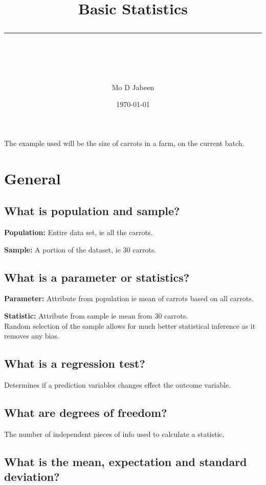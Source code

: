 \documentclass[11pt]{scrartcl} %
\title{	
	\normalfont\normalsize
	\vspace{20pt} %
	{\huge Basic Statistics}\\ %
	\vspace{12pt} %
	\rule{\linewidth}{2pt}\\ %
}
\author{\small Mo D Jabeen} %
\date{\normalsize\today} %
\begin{document}
\maketitle %

The example used will be the size of carrots in a farm, on the current batch.

\section{General}

\subsection{What is population and sample?}

\textbf{Population:} Entire data set, ie all the carrots.

\textbf{Sample:} A portion of the dataset, ie 30 carrots.

\subsection{What is a parameter or statistics?}

\textbf{Parameter:} Attribute from population ie mean of carrots based on all carrots.

\textbf{Statistic:} Attribute from sample ie mean from 30 carrots.\\

Random selection of the sample allows for much better statistical inference as it removes any
bias.

\subsection{What is a regression test?}

Determines if a prediction variables changes effect the outcome variable.

\subsection{What are degrees of freedom?}

The number of independent pieces of info used to calculate a statistic.

\subsection{What is the mean, expectation and standard
deviation?}
\end{document}
